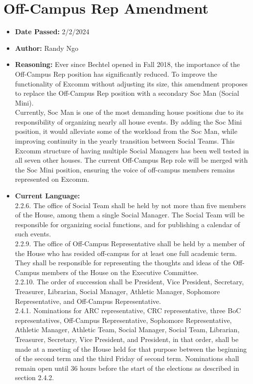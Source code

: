 \documentclass[10pt]{article} %
\begin{document}
\section{Off-Campus Rep Amendment}
\begin{itemize}
	\item \textbf{Date Passed:} 2/2/2024
	\item \textbf{Author:} Randy Ngo
	\item \textbf{Reasoning:} Ever since Bechtel opened in Fall 2018, the importance of the Off-Campus Rep position has significantly reduced. To improve the functionality of Excomm without adjusting its size, this amendment proposes to replace the Off-Campus Rep position with a secondary Soc Man (Social Mini). \\
	Currently, Soc Man is one of the most demanding house positions due to its responsibility of organizing nearly all house events. By adding the Soc Mini position, it would alleviate some of the workload from the Soc Man, while improving continuity in the yearly transition between Social Teams. This Excomm structure of having multiple Social Managers has been well tested in all seven other houses. The current Off-Campus Rep role will be merged with the Soc Mini position, ensuring the voice of off-campus members remains represented on Excomm.
	\item \textbf{Current Language:} \\
	2.2.6. The office of Social Team shall be held by not more than five members of the House, among them a single Social Manager. The Social Team will be responsible for organizing social functions, and for publishing a calendar of such events. \\
	2.2.9. The office of Off-Campus Representative shall be held by a member of the House who has resided off-campus for at least one full academic term. They shall be responsible for representing the thoughts and ideas of the Off-Campus members of the House on the Executive Committee. \\
	2.2.10. The order of succession shall be President, Vice President, Secretary, Treasurer, Librarian, Social Manager, Athletic Manager, Sophomore Representative, and Off-Campus Representative. \\
	2.4.1. Nominations for ARC representative, CRC representative, three BoC representatives, Off-Campus Representative, Sophomore Representative, Athletic Manager, Athletic Team, Social Manager, Social Team, Librarian, Treasurer, Secretary, Vice President, and President, in that order, shall be made at a meeting of the House held for that purpose between the beginning of the second term and the third Friday of second term. Nominations shall remain open until 36 hours before the start of the elections as described in section 2.4.2. \\

\end{itemize}
\end{document}
